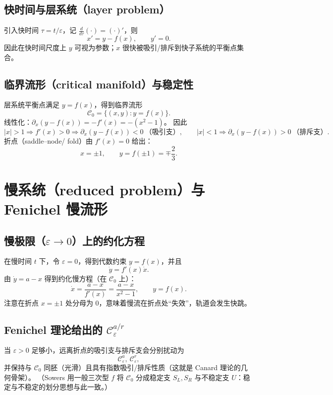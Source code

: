 	\subsection{快时间与层系统（layer problem）}
	引入快时间 $\tau=t/\varepsilon$，记 $\frac{d}{d\tau}(\cdot)=(\cdot)'$，则
	\begin{equation}\label{eq:layer}
		x' = y-f(x),\qquad y'=0 .
	\end{equation}
	因此在快时间尺度上 $y$ 可视为参数；$x$ 很快被吸引/排斥到快子系统的平衡点集合。
	
	\subsection{临界流形（critical manifold）与稳定性}
	层系统平衡点满足 $y=f(x)$，得到临界流形
	\begin{equation}\label{eq:C0}
		\mathcal C_0=\{(x,y): y=f(x)\}.
	\end{equation}
	线性化：$\partial_x(y-f(x)) = -f'(x)=-(x^2-1)$。
	因此
	\[
	|x|>1\Rightarrow f'(x)>0 \Rightarrow \partial_x(y-f(x))<0 \ \text{（吸引支）},\qquad
	|x|<1\Rightarrow \partial_x(y-f(x))>0 \ \text{（排斥支）}.
	\]
	折点（saddle--node/ fold）由 $f'(x)=0$ 给出：
	\begin{equation}\label{eq:folds}
		x=\pm 1,\qquad y=f(\pm 1)=\mp\frac{2}{3}.
	\end{equation}
	
	\section{慢系统（reduced problem）与 Fenichel 慢流形}
	
	\subsection{慢极限（$\varepsilon\to0$）上的约化方程}
	在慢时间 $t$ 下，令 $\varepsilon=0$，得到代数约束 $y=f(x)$，并且
	\[
	\dot y = f'(x)\dot x.
	\]
	由 $\dot y=a-x$ 得到约化慢方程（在 $\mathcal C_0$ 上）：
	\begin{equation}\label{eq:reduced}
		\dot x = \frac{a-x}{f'(x)}=\frac{a-x}{x^2-1},
		\qquad y=f(x).
	\end{equation}
	注意在折点 $x=\pm1$ 处分母为 $0$，意味着慢流在折点处“失效”，轨道会发生快跳。
	
	\subsection{Fenichel 理论给出的 $\mathcal C_\varepsilon^{a/r}$}
	当 $\varepsilon>0$ 足够小，远离折点的吸引支与排斥支会分别扰动为
	\[
	\mathcal C_\varepsilon^{a},\ \mathcal C_\varepsilon^{r},
	\]
	并保持与 $\mathcal C_0$ 同胚（光滑）且具有指数吸引/排斥性质（这就是 Canard 理论的几何骨架）。
	（Sowers 用一般三次型 $f$ 将 $\mathcal C_0$ 分成稳定支 $S_L,S_R$ 与不稳定支 $U$：稳定与不稳定的划分思想与此一致。）%
	
